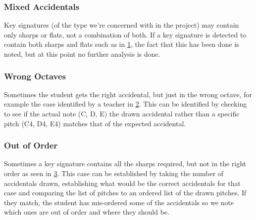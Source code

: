 \subsubsection{Mixed Accidentals}\label{sec:scoring-keysig-mixed}

Key signatures (of the type we're concerned with in the project) may contain only sharps or flats, not a combination of both. If a key signature is detected to contain both sharps and flats such as in \cref{fig:mixed-accidentals-bad}, the fact that this has been done is noted, but at this point no further analysis is done.

\begin{figure}[H]
  \caption{}
  \label{fig:mixed-accidentals-bad}
\end{figure}

\subsubsection{Wrong Octaves}\label{sec:scoring-keysig-octave}

Sometimes the student gets the right accidental, but just in the wrong octave, for example the case identified by a teacher in \cref{fig:right-accidental-wrong-octave}. This can be identified by checking to see if the actual note (C, D, E) the drawn accidental rather than a specific pitch (C4, D4, E4) matches that of the expected accidental.

\begin{figure}[H]
  \caption{}
  \label{fig:right-accidental-wrong-octave}
\end{figure}

\subsubsection{Out of Order}\label{sec:scoring-keysig-order}

Sometimes a key signature contains all the sharps required, but not in the right order as seen in \cref{fig:right-accidentals-wrong-ordering}. This case can be established by taking the number of accidentals drawn, establishing what would be the correct accidentals for that case and comparing the list of pitches to an ordered list of the drawn pitches. If they match, the student has mis-ordered some of the accidentals so we note which ones are out of order and where they should be.

\begin{figure}[H]
  \caption{}
  \label{fig:right-accidentals-wrong-ordering}
\end{figure}

